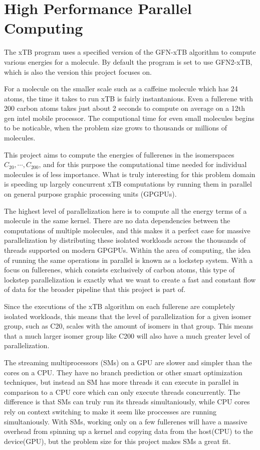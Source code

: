 
\section{High Performance Parallel Computing}

The xTB program uses a specified version of the GFN-xTB algorithm to compute various energies for a molecule. By default the program is set to use GFN2-xTB, which is also the version this project focuses on.

For a molecule on the smaller scale such as a caffeine molecule which has 24 atoms, the time it takes to run xTB is fairly instantanious. Even a fullerene with 200 carbon atoms takes just about 2 seconds to compute on average on a 12th gen intel mobile processor. The computional time for even small molecules begins to be noticable, when the problem size grows to thousands or millions of molecules.

This project aims to compute the energies of fullerenes in the isomerspaces \(C_{20}, \cdots, C_{200} \), and for this purpose the computational time needed for individual molecules is of less importance. What is truly interesting for this problem domain is speeding up largely concurrent xTB computations by running them in parallel on general purpose graphic processing units (GPGPUs).

The highest level of parallelization here is to compute all the energy terms of a molecule in the same kernel. There are no data dependencies between the computations of multiple molecules, and this makes it a perfect case for massive parallelization by distributing these isolated workloads across the thousands of threads supported on modern GPGPUs.
Within the area of computing, the idea of running the same operations in parallel is known as a lockstep system. With a focus on fullerenes, which consists exclusively of carbon atoms, this type of lockstep parallelization is exactly what we want to create a fast and constant flow of data for the broader pipeline that this project is part of.

Since the executions of the xTB algorithm on each fullerene are completely isolated workloads, this means that the level of parallelization for a given isomer group, such as C20, scales with the amount of isomers in that group. This means that a much larger isomer group like C200 will also have a much greater level of parallelization.

The streaming multiprocessors (SMs) on a GPU are slower and simpler than the cores on a CPU. They have no branch prediction or other smart optimization techniques, but instead an SM has more threads it can execute in parallel in comparison to a CPU core which can only execute threads concurrently. The difference is that SMs can truly run its threads simultaniously, while CPU cores rely on context switching to make it seem like proccesses are running simultaniously. With SMs, working only on a few fullerenes will have a massive overhead from spinning up a kernel and copying data from the host(CPU) to the device(GPU), but the problem size for this project makes SMs a great fit.

